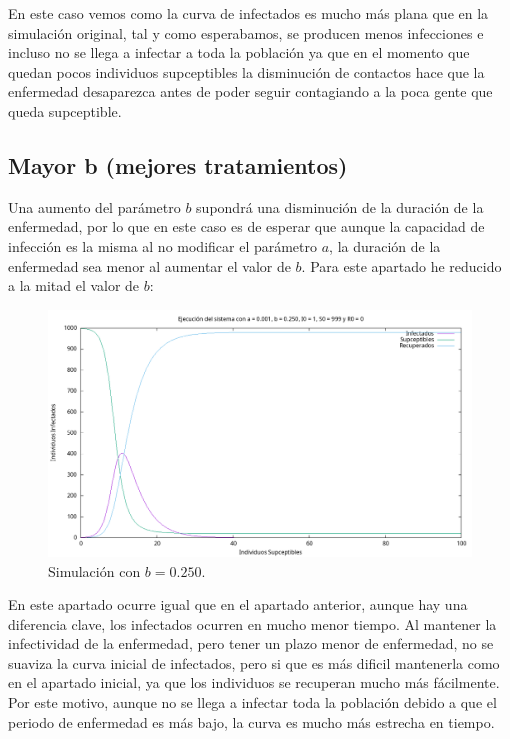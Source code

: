 \documentclass[12pt, spanish]{article}
\begin{document}
En este caso vemos como la curva de infectados es mucho más plana que en la simulación original, tal y como esperabamos, se producen menos infecciones e incluso no se llega a infectar a toda la población ya que en el momento que quedan pocos individuos supceptibles la disminución de contactos hace que la enfermedad desaparezca antes de poder seguir contagiando a la poca gente que queda supceptible.

\subsection{Mayor b (mejores tratamientos)}

Una aumento del parámetro $b$ supondrá una disminución de la duración de la enfermedad, por lo que en este caso es de esperar que aunque la capacidad de infección es la misma al no modificar el parámetro $a$, la duración de la enfermedad sea menor al aumentar el valor de $b$. Para este apartado he reducido a la mitad el valor de $b$:

\begin{figure}[H]
	 \centering
	 \includegraphics[width=\textwidth]{SIR_mayor_b.png}
		\caption{Simulación con $b = 0.250$.}
\end{figure}

En este apartado ocurre igual que en el apartado anterior, aunque hay una diferencia clave, los infectados ocurren en mucho menor tiempo. Al mantener la infectividad de la enfermedad, pero tener un plazo menor de enfermedad, no se suaviza la curva inicial de infectados, pero si que es más dificil mantenerla como en el apartado inicial, ya que los individuos se recuperan mucho más fácilmente. Por este motivo, aunque no se llega a infectar toda la población debido a que el periodo de enfermedad es más bajo, la curva es mucho más estrecha en tiempo.
\end{document}
